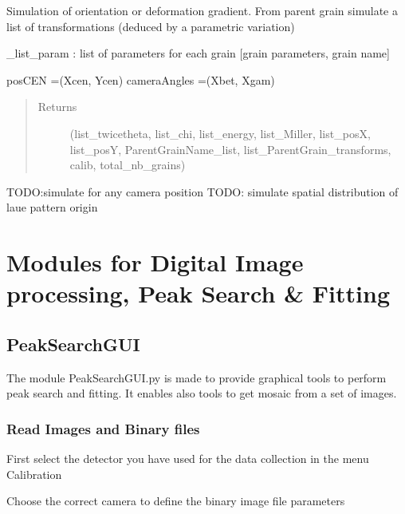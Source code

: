 \documentclass[letterpaper,10pt,english]{sphinxmanual}
\begin{document}
\begin{fulllineitems}
Simulation of orientation or deformation gradient.
From parent grain simulate a list of transformations (deduced by a parametric variation)

\_list\_param   : list of parameters for each grain  {[}grain parameters, grain name{]}

posCEN =(Xcen, Ycen)
cameraAngles =(Xbet, Xgam)
\begin{quote}\begin{description}
\item[{Returns}] \leavevmode
(list\_twicetheta,
list\_chi,
list\_energy,
list\_Miller,
list\_posX,
list\_posY,
ParentGrainName\_list,
list\_ParentGrain\_transforms,
calib,
total\_nb\_grains)

\end{description}\end{quote}

TODO:simulate for any camera position
TODO: simulate spatial distribution of laue pattern origin

\end{fulllineitems}



\section{Modules for Digital Image processing, Peak Search \& Fitting}
\label{\detokenize{LaueToolsModules:modules-for-digital-image-processing-peak-search-fitting}}

\subsection{PeakSearchGUI}
\label{\detokenize{PeakSearchGUI::doc}}\label{\detokenize{PeakSearchGUI:peaksearchgui}}\label{\detokenize{PeakSearchGUI:id1}}
The module PeakSearchGUI.py is made to provide graphical tools to perform peak search and fitting. It enables also tools to get mosaic from a set of images.


\subsubsection{Read Images and Binary files}
\label{\detokenize{PeakSearchGUI:read-images-and-binary-files}}
First select the detector you have used for the data collection in the menu Calibration

\noindent{}

Choose the correct camera to define the binary image file parameters
\end{document}
